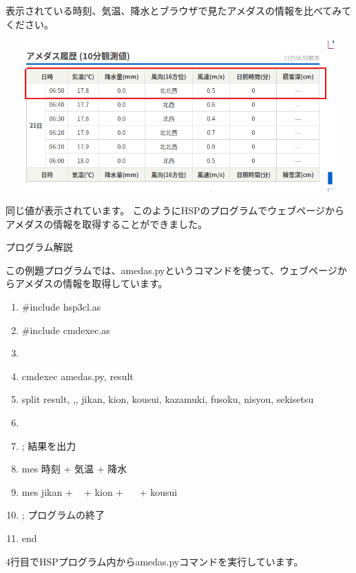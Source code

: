 \documentclass[a4paper,12pt,dvipdfmx]{jarticle}
\begin{document}
\bigskip


\bigskip

表示されている時刻、気温、降水とブラウザで見たアメダスの情報を比べてみてください。



\begin{center}
\includegraphics[width=17.006cm,height=5.777cm]{textbook-img029-1.png}

\end{center}
同じ値が表示されています。
このようにHSPのプログラムでウェブページからアメダスの情報を取得することができました。


\bigskip

\clearpage
プログラム解説

この例題プログラムでは、amedas.pyというコマンドを使って、ウェブページからアメダスの情報を取得しています。

\begin{center}
\begin{boxedminipage}{17.126cm}
\begin{enumerate}
\baselineskip 10pt
\setlength{\itemsep}{0cm} %
\item \#include {\textquotedbl}hsp3cl.as{\textquotedbl}
\item \#include {\textquotedbl}cmdexec.as{\textquotedbl}
\item 
\item cmdexec {\textquotedbl}amedas.py{\textquotedbl}, result
\item split result, {\textquotedbl},{\textquotedbl}, jikan, kion, kousui, kazamuki, fusoku, nisyou, sekisetsu
\item 
\item ; 結果を出力
\item mes {\textquotedbl}時刻 {\textquotedbl} + {\textquotedbl}気温 {\textquotedbl} +
{\textquotedbl}降水 {\textquotedbl} \ 
\item mes jikan + {\textquotedbl} \ {\textquotedbl} + kion + {\textquotedbl} \ \ {\textquotedbl} + kousui
\item ; プログラムの終了
\item end
\end{enumerate}
\end{boxedminipage}
\end{center}
4行目でHSPプログラム内からamedas.pyコマンドを実行しています。
\end{document}
